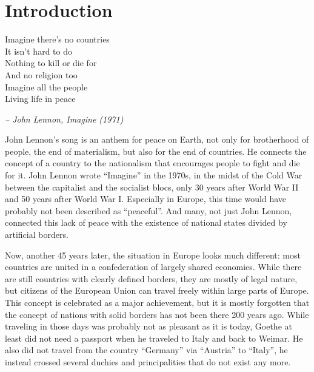 
\chapter{Introduction} %
\label{cha:introduction}
\begin{large}
\begin{quoteit}
  Imagine there's no countries \\
  It isn't hard to do \\
  Nothing to kill or die for \\
  And no religion too \\
  Imagine all the people \\
  Living life in peace
\end{quoteit}
\end{large}
\hfill \textit{-- John Lennon, \emph{Imagine} (1971)}

John Lennon's song is an anthem for peace on Earth, not only for brotherhood of people, the end of materialism, but also for the end of countries. He connects the concept of a country to the nationalism that encourages people to fight and die for it. John Lennon wrote ``Imagine'' in the 1970s, in the midst of the Cold War between the capitalist and the socialist blocs, only 30 years after World War II and 50 years after World War I. Especially in Europe, this time would have probably not been described as ``peaceful''. And many, not just John Lennon, connected this lack of peace with the existence of national states divided by artificial borders.

Now, another 45 years later, the situation in Europe looks much different: most countries are united in a confederation of largely shared economies. While there are still countries with clearly defined borders, they are mostly of legal nature, but citizens of the European Union can travel freely within large parts of Europe. This concept is celebrated as a major achievement, but it is mostly forgotten that the concept of nations with solid borders has not been there 200 years ago. While traveling in those days was probably not as pleasant as it is today, Goethe at least did not need a passport when he traveled to Italy and back to Weimar. He also did not travel from the country ``Germany'' via ``Austria'' to ``Italy'', he instead crossed several duchies and principalities that do not exist any more.


